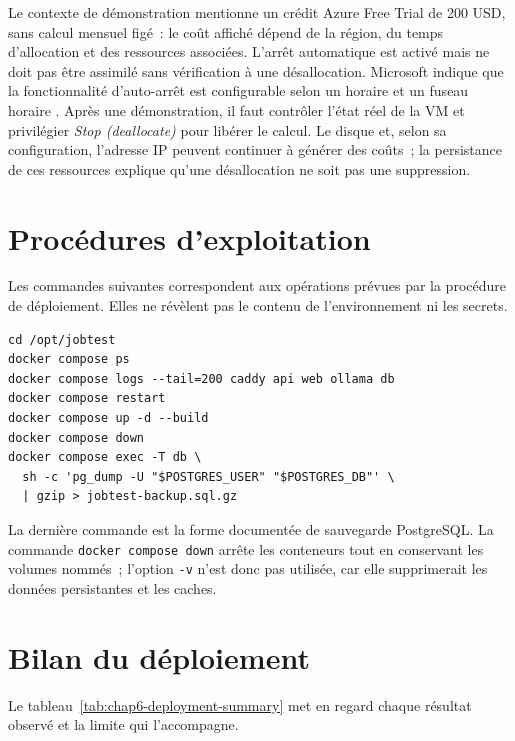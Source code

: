 Le contexte de démonstration mentionne un crédit Azure Free Trial de 200 USD, sans calcul mensuel figé~: le coût affiché dépend de la région, du temps d'allocation et des ressources associées. L'arrêt automatique est activé mais ne doit pas être assimilé sans vérification à une désallocation. Microsoft indique que la fonctionnalité d'auto-arrêt est configurable selon un horaire et un fuseau horaire \cite{azure_auto_shutdown}. Après une démonstration, il faut contrôler l'état réel de la VM et privilégier \emph{Stop (deallocate)} pour libérer le calcul. Le disque et, selon sa configuration, l'adresse IP peuvent continuer à générer des coûts~; la persistance de ces ressources explique qu'une désallocation ne soit pas une suppression.

\section{Procédures d'exploitation}

Les commandes suivantes correspondent aux opérations prévues par la procédure de déploiement. Elles ne révèlent pas le contenu de l'environnement ni les secrets.

\begin{verbatim}
cd /opt/jobtest
docker compose ps
docker compose logs --tail=200 caddy api web ollama db
docker compose restart
docker compose up -d --build
docker compose down
docker compose exec -T db \
  sh -c 'pg_dump -U "$POSTGRES_USER" "$POSTGRES_DB"' \
  | gzip > jobtest-backup.sql.gz
\end{verbatim}

La dernière commande est la forme documentée de sauvegarde PostgreSQL. La commande \texttt{docker compose down} arrête les conteneurs tout en conservant les volumes nommés~; l'option \texttt{-v} n'est donc pas utilisée, car elle supprimerait les données persistantes et les caches.

\section{Bilan du déploiement}

Le tableau~\ref{tab:chap6-deployment-summary} met en regard chaque résultat observé et la limite qui l'accompagne.

